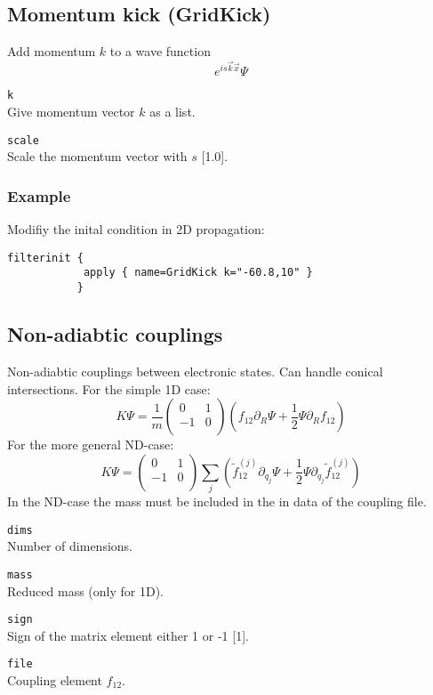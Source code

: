 \documentclass[a4paper,12pt]{scrbook}
\newcommand{\option}[2]{\item \texttt{#1}\\ #2}
\begin{document}
\subsection{Momentum kick (GridKick)}
Add momentum $k$ to a wave function
\begin{equation}
 e^{i s \vec{k} \vec{x}} \Psi
\end{equation}
\begin{options}
 \option{k}{Give momentum vector $k$ as a list.}
 \option{scale}{Scale the momentum vector with $s$ [1.0].}
\end{options}

\subsubsection*{Example}
Modifiy the inital condition in 2D propagation:
\begin{verbatim} 
filterinit {
            apply { name=GridKick k="-60.8,10" }
           }
\end{verbatim}


\subsection{Non-adiabtic couplings}
Non-adiabtic couplings between electronic states. Can handle conical intersections.
For the simple 1D case:
\begin{equation}
 K \Psi = \frac{1}{m}
\begin{pmatrix}
 0 & 1 \\
-1 & 0 \\
\end{pmatrix}
\left (
f_{12} \partial_R \Psi + \dfrac{1}{2} \Psi \partial_R f_{12}
\right )
\end{equation}
For the more general ND-case:
\begin{equation}
 K \Psi =
\begin{pmatrix}
 0 & 1 \\
-1 & 0 \\
\end{pmatrix}
\sum_j \left (
\tilde f_{12}^{(j)} \partial_{q_j} \Psi + \dfrac{1}{2} \Psi \partial_{q_j} \tilde f_{12}^{(j)}
\right )
\end{equation}
In the ND-case the mass must be included in the in data of the coupling file.

\begin{options}
 \option{dims}{Number of dimensions.}
 \option{mass}{Reduced mass (only for 1D).}
 \option{sign}{Sign of the matrix element either 1 or -1 [1].}
 \option{file}{Coupling element $f_{12}$.}
\end{options}
\end{document}
